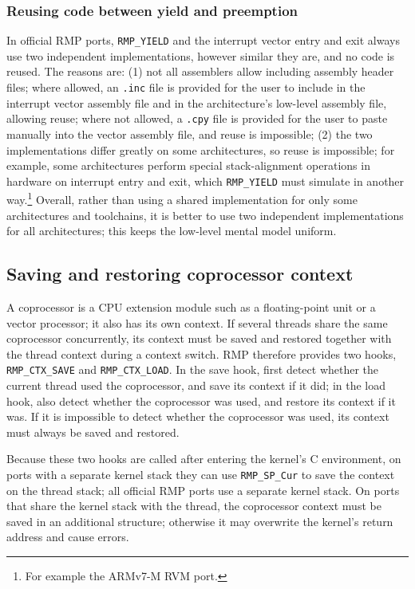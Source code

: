 \subsubsection{Reusing code between yield and preemption}

In official RMP ports, \texttt{RMP\_YIELD} and the interrupt vector entry and exit always use two independent implementations, however similar they are, and no code is reused.
The reasons are: (1) not all assemblers allow including assembly header files; where allowed, an \texttt{.inc} file is provided for the user to include in the interrupt vector assembly file and in the architecture's low-level assembly file, allowing reuse; where not allowed, a \texttt{.cpy} file is provided for the user to paste manually into the vector assembly file, and reuse is impossible; (2) the two implementations differ greatly on some architectures, so reuse is impossible; for example, some architectures perform special stack-alignment operations in hardware on interrupt entry and exit, which \texttt{RMP\_YIELD} must simulate in another way.\footnote{For example the ARMv7-M RVM port.}
Overall, rather than using a shared implementation for only some architectures and toolchains, it is better to use two independent implementations for all architectures; this keeps the low-level mental model uniform.

\subsection{Saving and restoring coprocessor context}

A coprocessor is a CPU extension module such as a floating-point unit or a vector processor; it also has its own context.
If several threads share the same coprocessor concurrently, its context must be saved and restored together with the thread context during a context switch.
RMP therefore provides two hooks, \texttt{RMP\_CTX\_SAVE} and \texttt{RMP\_CTX\_LOAD}.
In the save hook, first detect whether the current thread used the coprocessor, and save its context if it did; in the load hook, also detect whether the coprocessor was used, and restore its context if it was.
If it is impossible to detect whether the coprocessor was used, its context must always be saved and restored.

Because these two hooks are called after entering the kernel's C environment, on ports with a separate kernel stack they can use \texttt{RMP\_SP\_Cur} to save the context on the thread stack; all official RMP ports use a separate kernel stack.
On ports that share the kernel stack with the thread, the coprocessor context must be saved in an additional structure; otherwise it may overwrite the kernel's return address and cause errors.

